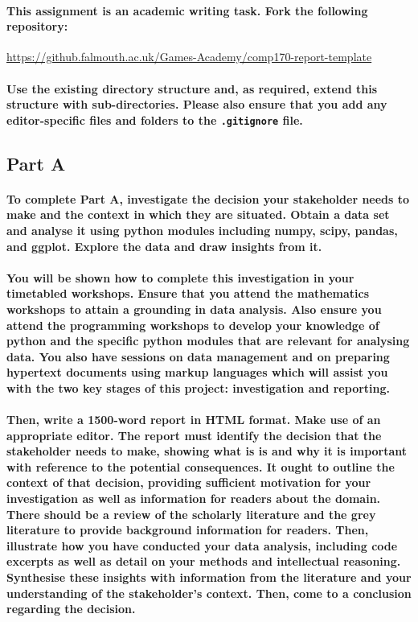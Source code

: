 \documentclass{../../fal_assignment}
\begin{document}
\paragraph{
This assignment is an \textbf{academic writing task}. Fork the following repository:
}

\url{https://github.falmouth.ac.uk/Games-Academy/comp170-report-template}

\paragraph{Use the existing directory structure and, as required, extend this structure with sub-directories.
Please also ensure that you add any editor-specific files and folders to the \texttt{.gitignore} file.}

\subsection*{Part A}

\paragraph{
To complete Part A, investigate the decision your stakeholder needs to make and the context in which they are situated. Obtain a data set and analyse it using python modules including numpy, scipy, pandas, and ggplot. Explore the data and draw insights from it.}

\paragraph{You will be shown how to complete this investigation in your timetabled workshops. Ensure that you attend the mathematics workshops to attain a grounding in data analysis. Also ensure you attend the programming workshops to develop your knowledge of python and the specific python modules that are relevant for analysing data. You also have sessions on data management and on preparing hypertext documents using markup languages which will assist you with the two key stages of this project: investigation and reporting.}

\paragraph{Then, write a 1500-word report in HTML format. Make use of an appropriate editor. The report must identify the decision that the stakeholder needs to make, showing what is is and why it is important with reference to the potential consequences. It ought to outline the context of that decision, providing sufficient motivation for your investigation as well as information for readers about the domain. There should be a review of the scholarly literature and the grey literature to provide background information for readers.  Then, illustrate how you have conducted your data analysis, including code excerpts as well as detail on your methods and intellectual reasoning. Synthesise these insights with information from the literature and your understanding of the stakeholder's context. Then, come to a conclusion regarding the decision.}
\end{document}
